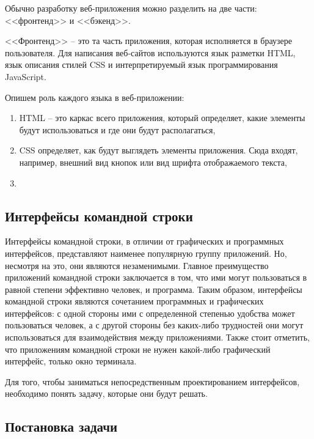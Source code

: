 Обычно разработку веб-приложения можно разделить на две части:
<<фронтенд>> и <<бэкенд>>.

<<Фронтенд>> -- это та часть приложения, которая исполняется в браузере пользователя.
Для написания веб-сайтов используются язык разметки HTML, язык описания стилей CSS и интерпретируемый
язык программирования JavaScript.

Опишем роль каждого языка в веб-приложении:
\begin{enumerate}
    \item HTML -- это каркас всего приложения, который определяет, какие элементы будут использоваться и
    где они будут располагаться,
    \item CSS определяет, как будут выглядеть элементы приложения. Сюда входят, например, внешний вид кнопок
    или вид шрифта отображаемого текста,
    \item 
    
\end{enumerate}



\subsection*{Интерфейсы командной строки}

Интерфейсы командной строки, в отличии от графических и программных интерфейсов, представляют
наименее популярную группу приложений. Но, несмотря на это, они являются
незаменимыми. Главное преимущество приложений командной строки заключается в том, что
ими могут пользоваться в равной степени эффективно человек, и программа. Таким образом,
интерфейсы командной строки являются сочетанием программных и графических интерфейсов:
с одной стороны ими с определенной степенью удобства может пользоваться человек, а с другой
стороны без каких-либо трудностей они могут использоваться для взаимодействия между
приложениями. Также стоит отметить, что приложениям командной строки не нужен какой-либо
графический интерфейс, только окно терминала.

Для того, чтобы заниматься непосредственным проектированием интерфейсов, необходимо
понять задачу, которые они будут решать.

\subsection*{Постановка задачи}

